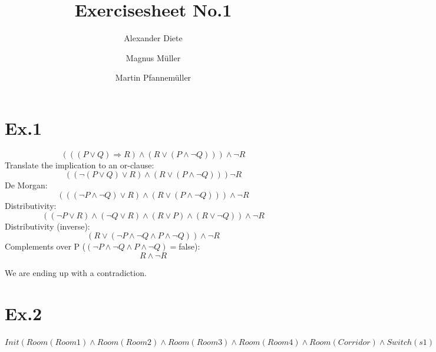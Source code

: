 \documentclass[11pt]{article}
\title{Exercisesheet No.1}
\author{Alexander Diete \and Magnus M\"uller \and Martin Pfannem\"uller}
\begin{document}
\maketitle
\section*{Ex.1}
$$(((P \vee Q) \Rightarrow R) \wedge (R \vee (P \wedge \neg Q))) \wedge \neg R$$
Translate the implication to an or-clause:
$$((\neg(P \vee Q) \vee R) \wedge (R \vee (P \wedge \neg Q))) \neg R$$
De Morgan:
$$(((\neg P \wedge \neg Q) \vee R) \wedge (R \vee (P \wedge \neg Q))) \wedge \neg R$$
Distributivity:
$$((\neg P \vee R) \wedge (\neg Q \vee R) \wedge (R \vee P) \wedge (R \vee \neg Q))\wedge \neg R$$
Distributivity (inverse):
$$(R \vee (\neg P \wedge \neg Q \wedge P \wedge \neg Q))\wedge \neg R$$
Complements over P ($(\neg P \wedge \neg Q \wedge P \wedge \neg Q) = $false):
$$R \wedge \neg R$$

We are ending up with a contradiction.

\section*{Ex.2}

$\displaystyle Init(Room(Room1) \wedge Room(Room2) \wedge Room(Room3) \wedge Room(Room4) \wedge Room(Corridor) \wedge Switch(s1) \wedge Switch(s2) \wedge Switch(s3) \wedge Switch(s4) \wedge Box(b1) \wedge Box(b2) \wedge Box(b3) \wedge Box(b4) \wedge Door(Door1) \wedge Door(Door2) \wedge Door(Door3) \wedge Door(Door4) \wedge At(Shakey,Floor) \wedge In(Shakey,Room3) \wedge TurnedOn(s4) \wedge TurnedOff(s3) \wedge TurnedOff(s2) \wedge TurnedOn(s1) \wedge In(b1,Room1) \wedge In(b2,Room1) \wedge In(b3,Room1) \wedge In(b4,Room1) \wedge At(s1,Room1) \wedge At(s2,Room2) \wedge At(s3,Room3) \wedge At(s4,Room4) \wedge In(Door1,Room1) \wedge In(Door1,Corridor) \wedge In(Door2,Room2) \wedge In(Door2,Corridor) \wedge In(Door3,Room3) \wedge In(Door3,Corridor) \wedge In(Door4,Room4) \wedge In(Door4,Corridor))$
\end{document}
